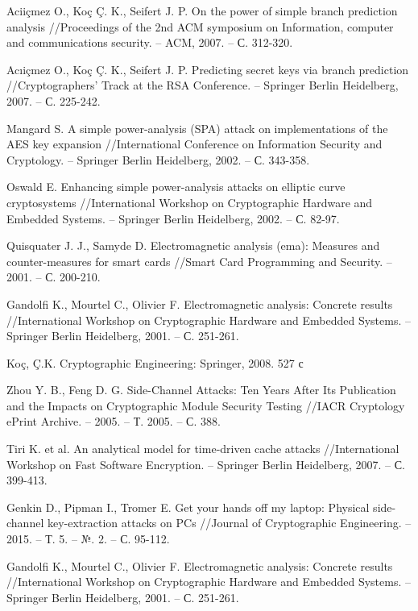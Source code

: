 \begin{thebibliography}{00}
  Aciiçmez O., Koç Ç. K., Seifert J. P. On the power of simple branch prediction analysis //Proceedings of the 2nd ACM symposium on Information, computer and communications security. – ACM, 2007. – С. 312-320.

  Acıiçmez O., Koç Ç. K., Seifert J. P. Predicting secret keys via branch prediction //Cryptographers’ Track at the RSA Conference. – Springer Berlin Heidelberg, 2007. – С. 225-242.

  Mangard S. A simple power-analysis (SPA) attack on implementations of the AES key expansion //International Conference on Information Security and Cryptology. – Springer Berlin Heidelberg, 2002. – С. 343-358.

  Oswald E. Enhancing simple power-analysis attacks on elliptic curve cryptosystems //International Workshop on Cryptographic Hardware and Embedded Systems. – Springer Berlin Heidelberg, 2002. – С. 82-97.

  Quisquater J. J., Samyde D. Electromagnetic analysis (ema): Measures and counter-measures for smart cards //Smart Card Programming and Security. – 2001. – С. 200-210.

  Gandolfi K., Mourtel C., Olivier F. Electromagnetic analysis: Concrete results //International Workshop on Cryptographic Hardware and Embedded Systems. – Springer Berlin Heidelberg, 2001. – С. 251-261.

  Ko{\c{c}}, \c{C}.K. Cryptographic Engineering: Springer, 2008. 527 с

  Zhou Y. B., Feng D. G. Side-Channel Attacks: Ten Years After Its Publication and the Impacts on Cryptographic Module Security Testing //IACR Cryptology ePrint Archive. – 2005. – Т. 2005. – С. 388.

  Tiri K. et al. An analytical model for time-driven cache attacks //International Workshop on Fast Software Encryption. – Springer Berlin Heidelberg, 2007. – С. 399-413.

  Genkin D., Pipman I., Tromer E. Get your hands off my laptop: Physical side-channel key-extraction attacks on PCs //Journal of Cryptographic Engineering. – 2015. – Т. 5. – №. 2. – С. 95-112. 

  Gandolfi K., Mourtel C., Olivier F. Electromagnetic analysis: Concrete results //International Workshop on Cryptographic Hardware and Embedded Systems. – Springer Berlin Heidelberg, 2001. – С. 251-261.


\end{thebibliography}
